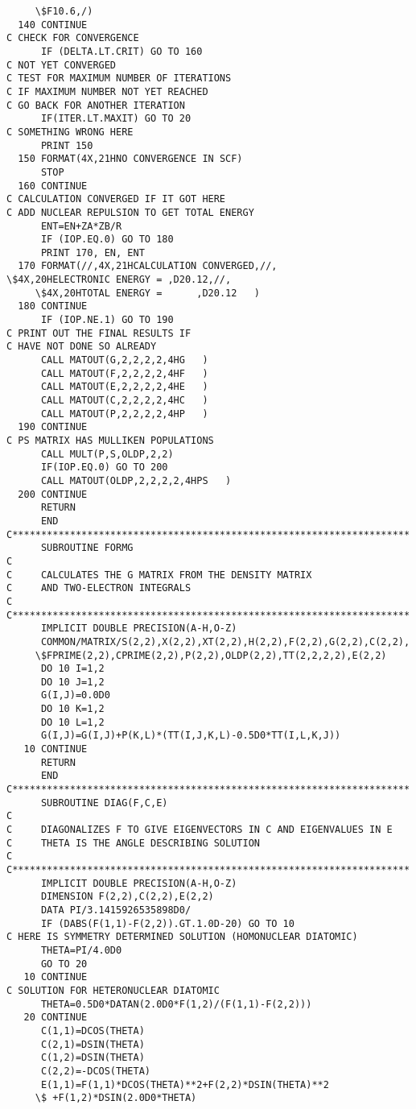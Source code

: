 \begin{verbatim}
     \$F10.6,/)
  140 CONTINUE
C CHECK FOR CONVERGENCE
      IF (DELTA.LT.CRIT) GO TO 160
C NOT YET CONVERGED
C TEST FOR MAXIMUM NUMBER OF ITERATIONS
C IF MAXIMUM NUMBER NOT YET REACHED
C GO BACK FOR ANOTHER ITERATION
      IF(ITER.LT.MAXIT) GO TO 20
C SOMETHING WRONG HERE
      PRINT 150
  150 FORMAT(4X,21HNO CONVERGENCE IN SCF)
      STOP
  160 CONTINUE
C CALCULATION CONVERGED IF IT GOT HERE
C ADD NUCLEAR REPULSION TO GET TOTAL ENERGY
      ENT=EN+ZA*ZB/R
      IF (IOP.EQ.0) GO TO 180
      PRINT 170, EN, ENT
  170 FORMAT(//,4X,21HCALCULATION CONVERGED,//,
\$4X,20HELECTRONIC ENERGY = ,D20.12,//,
     \$4X,20HTOTAL ENERGY =      ,D20.12   )
  180 CONTINUE
      IF (IOP.NE.1) GO TO 190
C PRINT OUT THE FINAL RESULTS IF
C HAVE NOT DONE SO ALREADY
      CALL MATOUT(G,2,2,2,2,4HG   )
      CALL MATOUT(F,2,2,2,2,4HF   )
      CALL MATOUT(E,2,2,2,2,4HE   )
      CALL MATOUT(C,2,2,2,2,4HC   )
      CALL MATOUT(P,2,2,2,2,4HP   )
  190 CONTINUE
C PS MATRIX HAS MULLIKEN POPULATIONS
      CALL MULT(P,S,OLDP,2,2)
      IF(IOP.EQ.0) GO TO 200
      CALL MATOUT(OLDP,2,2,2,2,4HPS   )
  200 CONTINUE
      RETURN
      END
C*********************************************************************
      SUBROUTINE FORMG
C
C     CALCULATES THE G MATRIX FROM THE DENSITY MATRIX
C     AND TWO-ELECTRON INTEGRALS
C
C*********************************************************************
      IMPLICIT DOUBLE PRECISION(A-H,O-Z)
      COMMON/MATRIX/S(2,2),X(2,2),XT(2,2),H(2,2),F(2,2),G(2,2),C(2,2),
     \$FPRIME(2,2),CPRIME(2,2),P(2,2),OLDP(2,2),TT(2,2,2,2),E(2,2)
      DO 10 I=1,2
      DO 10 J=1,2
      G(I,J)=0.0D0
      DO 10 K=1,2
      DO 10 L=1,2
      G(I,J)=G(I,J)+P(K,L)*(TT(I,J,K,L)-0.5D0*TT(I,L,K,J))
   10 CONTINUE
      RETURN
      END
C*********************************************************************
      SUBROUTINE DIAG(F,C,E)
C
C     DIAGONALIZES F TO GIVE EIGENVECTORS IN C AND EIGENVALUES IN E
C     THETA IS THE ANGLE DESCRIBING SOLUTION
C
C*********************************************************************
      IMPLICIT DOUBLE PRECISION(A-H,O-Z)
      DIMENSION F(2,2),C(2,2),E(2,2)
      DATA PI/3.1415926535898D0/
      IF (DABS(F(1,1)-F(2,2)).GT.1.0D-20) GO TO 10
C HERE IS SYMMETRY DETERMINED SOLUTION (HOMONUCLEAR DIATOMIC)
      THETA=PI/4.0D0
      GO TO 20
   10 CONTINUE
C SOLUTION FOR HETERONUCLEAR DIATOMIC
      THETA=0.5D0*DATAN(2.0D0*F(1,2)/(F(1,1)-F(2,2)))
   20 CONTINUE
      C(1,1)=DCOS(THETA)
      C(2,1)=DSIN(THETA)
      C(1,2)=DSIN(THETA)
      C(2,2)=-DCOS(THETA)
      E(1,1)=F(1,1)*DCOS(THETA)**2+F(2,2)*DSIN(THETA)**2
     \$ +F(1,2)*DSIN(2.0D0*THETA)

\end{verbatim}
